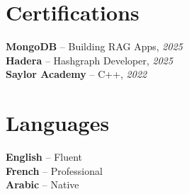 \documentclass[10pt,a4paper]{article}
\begin{document}
\vspace{3pt}
\section*{Certifications}
{\small
\textbf{MongoDB} -- Building RAG Apps, \textit{2025}\\[1pt]
\textbf{Hadera} -- Hashgraph Developer, \textit{2025}\\[1pt]
\textbf{Saylor Academy} -- C++, \textit{2022}
}

\section*{Languages}
{\small
\textbf{English} -- Fluent\\[1pt]
\textbf{French} -- Professional\\[1pt]
\textbf{Arabic} -- Native
}
\end{document}
